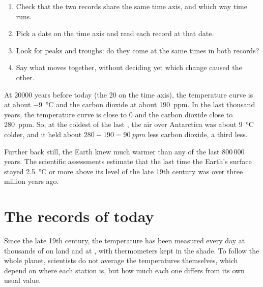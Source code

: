 \begin{method}
\begin{enumerate}
  \item Check that the two records share the same time axis, and which
        way time runs.
  \item Pick a date on the time axis and read each record at that date.
  \item Look for peaks and troughs: do they come at the same times in both
        records?
  \item Say what moves together, without deciding yet which change caused
        the other.
\end{enumerate}
\end{method}

\begin{example}
At \num{20000} years before today (the 20 on the time axis), the
temperature curve is at about \qty{-9}{\degreeCelsius} and the carbon
dioxide at about \qty{190}{ppm}. In the last thousand years, the
temperature curve is close to 0 and the carbon dioxide close to
\qty{280}{ppm}. So, at the coldest of the last , the air over
Antarctica was about \qty{9}{\degreeCelsius} colder, and it held about
$280 - 190 = \qty{90}{ppm}$ less carbon dioxide, a third less.
\end{example}

Further back still, the Earth knew  much warmer than any of the
last 800\,000 years. The scientific assessments estimate that the last
time the Earth's surface stayed \qty{2.5}{\degreeCelsius} or more above
its level of the late 19th century was over three million years ago.

\section{The records of today}

Since the late 19th century, the temperature has been measured every day
at thousands of  on land and at , with thermometers
kept in the shade. To follow the whole planet, scientists do not average
the temperatures themselves, which depend on where each station is, but
how much each one differs from its own usual value.

